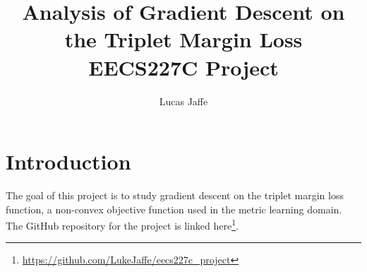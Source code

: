 \documentclass[11pt]{article}
\begin{document}
\author{Lucas Jaffe}

\title{
    Analysis of Gradient Descent on the Triplet Margin Loss \\
    \large EECS227C Project
    }
\maketitle

\medskip




\section{Introduction}

The goal of this project is to study gradient descent on the triplet margin loss function, a non-convex objective function used in the metric learning domain. The GitHub repository for the project is linked here\footnote{\url{https://github.com/LukeJaffe/eecs227c_project}}.
\end{document}
